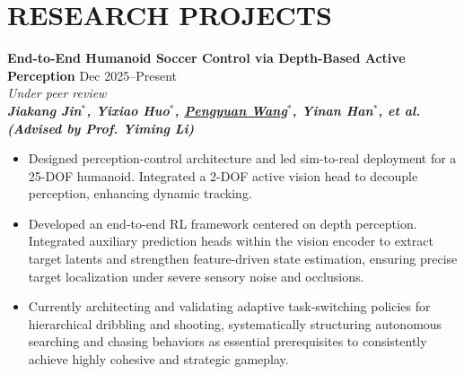 \documentclass[a4paper,11pt]{article}
\begin{document}
\section{RESEARCH PROJECTS}

\textcolor{titleblue}{\textbf{End-to-End Humanoid Soccer Control via Depth-Based Active Perception}} \hfill Dec 2025--Present \\
\textit{Under peer review} \\
\textit{\textbf{Jiakang Jin$^*$, Yixiao Huo$^*$, \underline{Pengyuan Wang$^*$}, Yinan Han$^*$, et al. (Advised by Prof. Yiming Li)}}
\begin{itemize}[nosep,after=\strut, leftmargin=1.5em, itemsep=3pt,label=$\bullet$]
\item Designed perception-control architecture and led sim-to-real deployment for a 25-DOF humanoid. Integrated a 2-DOF active vision head to decouple perception, enhancing dynamic tracking.
\item Developed an end-to-end RL framework centered on depth perception. Integrated auxiliary prediction heads within the vision encoder to extract target latents and strengthen feature-driven state estimation, ensuring precise target localization under severe sensory noise and occlusions.
\item Currently architecting and validating adaptive task-switching policies for hierarchical dribbling and shooting, systematically structuring autonomous searching and chasing behaviors as essential prerequisites to consistently achieve highly cohesive and strategic gameplay.
\end{itemize}

\vspace{6pt}
\end{document}
